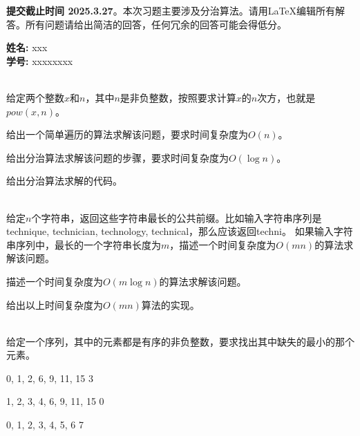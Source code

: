 \documentclass[12pt,twoside]{article}
\newcommand{\theproblemsetnum}{2}
\newcommand{\releasedate}{2025.3.20}
\newcommand{\partaduedate}{ 2025.3.27}
\begin{document}
\handout{实验 \theproblemsetnum}{\releasedate}
\textbf{提交截止时间 {\bf \partaduedate}}。本次习题主要涉及分治算法。请用\LaTeX 编辑所有解答。所有问题请给出简洁的回答，任何冗余的回答可能会得低分。

\setlength{\parindent}{0pt}
\medskip\hrulefill\medskip

{\bf 姓名:} xxx\\
{\bf 学号:} xxxxxxxx\\


\medskip

\medskip\hrulefill

\begin{problems}

\\
给定两个整数$x$和$n$，其中$n$是非负整数，按照要求计算$x$的$n$次方，也就是$pow(x,n)$。

\bparts
\ppart 给出一个简单遍历的算法求解该问题，要求时间复杂度为$O(n)$。


\ppart 给出分治算法求解该问题的步骤，要求时间复杂度为$O(\log n)$。

\ppart 给出分治算法求解的代码。

\eparts

\newpage
{}  \\
给定$n$个字符串，返回这些字符串最长的公共前缀。比如输入字符串序列是 technique, technician, technology, technical，那么应该返回techni。
\bparts
\ppart 如果输入字符串序列中，最长的一个字符串长度为$m$，描述一个时间复杂度为$O(mn)$的算法求解该问题。

\ppart 描述一个时间复杂度为$O(m\log n)$的算法求解该问题。

\ppart 给出以上时间复杂度为$O(mn)$算法的实现。
\eparts


\newpage
{} \\
给定一个序列，其中的元素都是有序的非负整数，要求找出其中缺失的最小的那个元素。

\begin{probexamples}
   {0, 1, 2, 6, 9, 11, 15}
   {3}
   {}
\end{probexamples}

\begin{probexamples}
   {1, 2, 3, 4, 6, 9, 11, 15}
   {0}
   {}
\end{probexamples}

\begin{probexamples}
   {0, 1, 2, 3, 4, 5, 6}
   {7}
   {}
\end{probexamples}


\end{problems}
\end{document}
